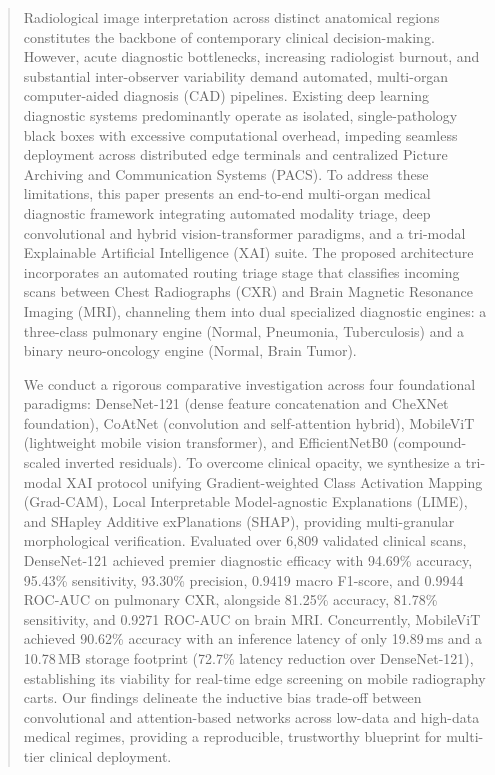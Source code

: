 \documentclass[journal]{IEEEtran}
\begin{document}
\begin{abstract}
Radiological image interpretation across distinct anatomical regions constitutes the backbone of contemporary clinical decision-making. However, acute diagnostic bottlenecks, increasing radiologist burnout, and substantial inter-observer variability demand automated, multi-organ computer-aided diagnosis (CAD) pipelines. Existing deep learning diagnostic systems predominantly operate as isolated, single-pathology black boxes with excessive computational overhead, impeding seamless deployment across distributed edge terminals and centralized Picture Archiving and Communication Systems (PACS). To address these limitations, this paper presents an end-to-end multi-organ medical diagnostic framework integrating automated modality triage, deep convolutional and hybrid vision-transformer paradigms, and a tri-modal Explainable Artificial Intelligence (XAI) suite. The proposed architecture incorporates an automated routing triage stage that classifies incoming scans between Chest Radiographs (CXR) and Brain Magnetic Resonance Imaging (MRI), channeling them into dual specialized diagnostic engines: a three-class pulmonary engine (Normal, Pneumonia, Tuberculosis) and a binary neuro-oncology engine (Normal, Brain Tumor). 

We conduct a rigorous comparative investigation across four foundational paradigms: DenseNet-121 (dense feature concatenation and CheXNet foundation), CoAtNet (convolution and self-attention hybrid), MobileViT (lightweight mobile vision transformer), and EfficientNetB0 (compound-scaled inverted residuals). To overcome clinical opacity, we synthesize a tri-modal XAI protocol unifying Gradient-weighted Class Activation Mapping (Grad-CAM), Local Interpretable Model-agnostic Explanations (LIME), and SHapley Additive exPlanations (SHAP), providing multi-granular morphological verification. Evaluated over 6,809 validated clinical scans, DenseNet-121 achieved premier diagnostic efficacy with 94.69\% accuracy, 95.43\% sensitivity, 93.30\% precision, 0.9419 macro F1-score, and 0.9944 ROC-AUC on pulmonary CXR, alongside 81.25\% accuracy, 81.78\% sensitivity, and 0.9271 ROC-AUC on brain MRI. Concurrently, MobileViT achieved 90.62\% accuracy with an inference latency of only 19.89\,ms and a 10.78\,MB storage footprint (72.7\% latency reduction over DenseNet-121), establishing its viability for real-time edge screening on mobile radiography carts. Our findings delineate the inductive bias trade-off between convolutional and attention-based networks across low-data and high-data medical regimes, providing a reproducible, trustworthy blueprint for multi-tier clinical deployment.
\end{abstract}
\end{document}
